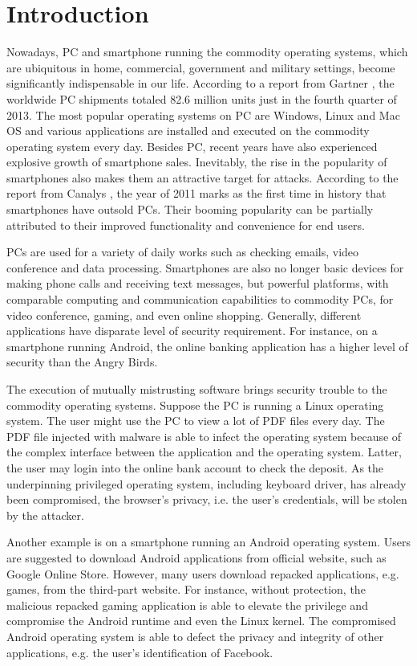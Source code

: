 \section{Introduction}
\label{sec:introduction}

Nowadays, PC and smartphone running the commodity operating systems, which are
ubiquitous in home, commercial, government and military settings, become
significantly indispensable in our life. According to a report from Gartner
\cite{Gartner}, the
worldwide PC shipments totaled 82.6 million units just in the fourth quarter of
2013.  The most popular operating systems on PC are Windows, Linux and Mac OS
and various applications are installed and executed on the commodity operating
system every day. Besides PC, recent years have also experienced explosive
growth of smartphone sales. Inevitably, the rise in the popularity of
smartphones also makes them an attractive target for attacks. According to the
report from Canalys \cite{Canalys}, the year of 2011 marks as the first time in history that
smartphones have outsold PCs. Their booming popularity can be partially
attributed to their improved functionality and convenience for end users. 

PCs are used for a variety of daily works such as checking emails, video
conference and data processing. Smartphones are also no longer basic devices for
making phone calls and receiving text messages, but powerful platforms, with
comparable computing and communication capabilities to commodity PCs, for video
conference, gaming, and even online shopping. Generally, different applications
have disparate level of security requirement. For instance, on a smartphone
running Android, the online banking application has a higher level of security
than the Angry Birds.

The execution of mutually mistrusting software brings security trouble to the
commodity operating systems. Suppose the PC is running a Linux operating system.
The user might use the PC to view a lot of PDF files every day. The PDF file
injected with malware is able to infect the operating system because of the
complex interface between the application and the operating system. Latter, the
user may login into the online bank account to check the deposit. As the
underpinning privileged operating system, including keyboard driver, has already
been compromised, the browser’s privacy, i.e. the user’s credentials, will be
stolen by the attacker.

Another example is on a smartphone running an Android operating system. Users
are suggested to download Android applications from official website, such as
Google Online Store. However, many users download repacked applications, e.g.
games, from the third-part website. For instance, without protection, the
malicious repacked gaming application is able to elevate the privilege and
compromise the Android runtime and even the Linux kernel. The compromised
Android operating system is able to defect the privacy and integrity of other
applications, e.g. the user’s identification of Facebook.

